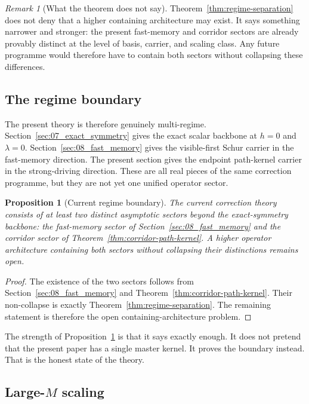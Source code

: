 \documentclass[11pt]{article}
\numberwithin{equation}{section}
\theoremstyle{thmcompact}
\newtheorem{proposition}[theorem]{Proposition}
\theoremstyle{remark}
\newtheorem*{remarkplain}{Remark}
\newenvironment{remark}[1][]%
{\begin{remarkbox}\begin{remarkplain}[#1]\normalfont}
		{\end{remarkplain}\end{remarkbox}}
\begin{document}
\begin{remark}[What the theorem does not say]
Theorem~\ref{thm:regime-separation} does not deny that a higher containing architecture may exist. It says something narrower and stronger: the present fast-memory and corridor sectors are already provably distinct at the level of basis, carrier, and scaling class. Any future programme would therefore have to contain both sectors without collapsing these differences.
\end{remark}

\subsection{The regime boundary}
\label{subsec:regime-boundary}

The present theory is therefore genuinely multi-regime. Section~\ref{sec:07_exact_symmetry} gives the exact scalar backbone at $h=0$ and $\lambda=0$. Section~\ref{sec:08_fast_memory} gives the visible-first Schur carrier in the fast-memory direction. The present section gives the endpoint path-kernel carrier in the strong-driving direction. These are all real pieces of the same correction programme, but they are not yet one unified operator sector.

\begin{proposition}[Current regime boundary]\label{prop:current-regime-boundary}
The current correction theory consists of at least two distinct asymptotic sectors beyond the exact-symmetry backbone: the fast-memory sector of Section~\ref{sec:08_fast_memory} and the corridor sector of Theorem~\ref{thm:corridor-path-kernel}. A higher operator architecture containing both sectors without collapsing their distinctions remains open.
\end{proposition}

\begin{proof}
The existence of the two sectors follows from Section~\ref{sec:08_fast_memory} and Theorem~\ref{thm:corridor-path-kernel}. Their non-collapse is exactly Theorem~\ref{thm:regime-separation}. The remaining statement is therefore the open containing-architecture problem.
\end{proof}

The strength of Proposition~\ref{prop:current-regime-boundary} is that it says exactly enough. It does not pretend that the present paper has a single master kernel. It proves the boundary instead. That is the honest state of the theory.

\subsection{Large-$M$ scaling}
\label{subsec:large-M-scaling}
\end{document}
